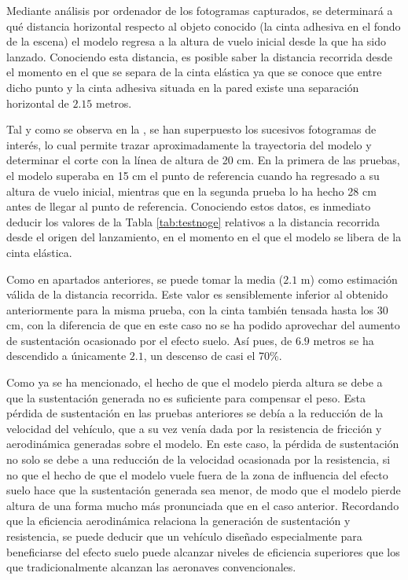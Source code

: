 
Mediante análisis por ordenador de los fotogramas capturados, se determinará a qué distancia horizontal respecto al objeto conocido (la cinta adhesiva en el fondo de la escena) el modelo regresa a la altura de vuelo inicial desde la que ha sido lanzado. Conociendo esta distancia, es posible saber la distancia recorrida desde el momento en el que se separa de la cinta elástica ya que se conoce que entre dicho punto y la cinta adhesiva situada en la pared existe una separación horizontal de $2.15$ metros.


Tal y como se observa en la , se han superpuesto los sucesivos fotogramas de interés, lo cual permite trazar aproximadamente la trayectoria del modelo y determinar el corte con la línea de altura de 20 cm. En la primera de las pruebas, el modelo superaba en 15 cm el punto de referencia cuando ha regresado a su altura de vuelo inicial, mientras que en la segunda prueba lo ha hecho 28 cm antes de llegar al punto de referencia. Conociendo estos datos, es inmediato deducir los valores de la Tabla \ref{tab:testnoge} relativos a la distancia recorrida desde el origen del lanzamiento, en el momento en el que el modelo se libera de la cinta elástica.

Como en apartados anteriores, se puede tomar la media ($2.1$ m) como estimación válida de la distancia recorrida. Este valor es sensiblemente inferior al obtenido anteriormente para la misma prueba, con la cinta también tensada hasta los 30 cm, con la diferencia de que en este caso no se ha podido aprovechar del aumento de sustentación ocasionado por el efecto suelo. Así pues, de $6.9$ metros se ha descendido a únicamente $2.1$, un descenso de casi el 70\%.

Como ya se ha mencionado, el hecho de que el modelo pierda altura se debe a que la sustentación generada no es suficiente para compensar el peso. Esta pérdida de sustentación en las pruebas anteriores se debía a la reducción de la velocidad del vehículo, que a su vez venía dada por la resistencia de fricción y aerodinámica generadas sobre el modelo. En este caso, la pérdida de sustentación no solo se debe a una reducción de la velocidad ocasionada por la resistencia, si no que el hecho de que el modelo vuele fuera de la zona de influencia del efecto suelo hace que la sustentación generada sea menor, de modo que el modelo pierde altura de una forma mucho más pronunciada que en el caso anterior. Recordando que la eficiencia aerodinámica relaciona la generación de sustentación y resistencia, se puede deducir que un vehículo diseñado especialmente para beneficiarse del efecto suelo puede alcanzar niveles de eficiencia superiores que los que tradicionalmente alcanzan las aeronaves convencionales.


